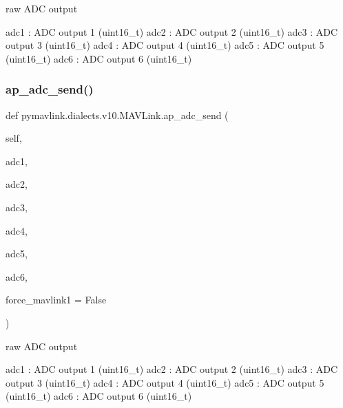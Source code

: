 \begin{DoxyVerb}raw ADC output

adc1                      : ADC output 1 (uint16_t)
adc2                      : ADC output 2 (uint16_t)
adc3                      : ADC output 3 (uint16_t)
adc4                      : ADC output 4 (uint16_t)
adc5                      : ADC output 5 (uint16_t)
adc6                      : ADC output 6 (uint16_t)\end{DoxyVerb}
 \mbox{\label{classpymavlink_1_1dialects_1_1v10_1_1MAVLink_a4d9052e1d2adb7e28863d72214dc6c43}} 
\subsubsection{\texorpdfstring{ap\+\_\+adc\+\_\+send()}{ap\_adc\_send()}}
{\footnotesize\ttfamily def pymavlink.\+dialects.\+v10.\+M\+A\+V\+Link.\+ap\+\_\+adc\+\_\+send (\begin{DoxyParamCaption}\item[{}]{self,  }\item[{}]{adc1,  }\item[{}]{adc2,  }\item[{}]{adc3,  }\item[{}]{adc4,  }\item[{}]{adc5,  }\item[{}]{adc6,  }\item[{}]{force\+\_\+mavlink1 = {\ttfamily False} }\end{DoxyParamCaption})}

\begin{DoxyVerb}raw ADC output

adc1                      : ADC output 1 (uint16_t)
adc2                      : ADC output 2 (uint16_t)
adc3                      : ADC output 3 (uint16_t)
adc4                      : ADC output 4 (uint16_t)
adc5                      : ADC output 5 (uint16_t)
adc6                      : ADC output 6 (uint16_t)\end{DoxyVerb}
 \mbox{\label{classpymavlink_1_1dialects_1_1v10_1_1MAVLink_a2c3bacbcae08d0a0205416b9ab25e42d}} 
